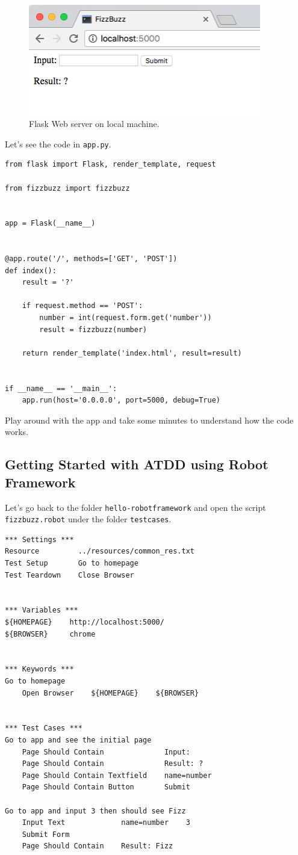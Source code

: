 \documentclass{article}
\begin{document}
\begin{figure}[t]
  \centering
  \includegraphics[width=4in]{figures/flask-web-server-local}
  \caption{Flask Web server on local machine.}
  \label{fig:flask-web-server-local}
\end{figure}

\noindent Let's see the code in {\tt app.py}.

\begin{verbatim}
from flask import Flask, render_template, request

from fizzbuzz import fizzbuzz


app = Flask(__name__)


@app.route('/', methods=['GET', 'POST'])
def index():
    result = '?'

    if request.method == 'POST':
        number = int(request.form.get('number'))
        result = fizzbuzz(number)

    return render_template('index.html', result=result)


if __name__ == '__main__':
    app.run(host='0.0.0.0', port=5000, debug=True)
\end{verbatim}

\noindent Play around with the app and take some minutes to understand how the
code works.

\subsection*{Getting Started with ATDD using Robot Framework}

\noindent Let's go back to the folder {\tt hello-robotframework} and open the
script {\tt fizzbuzz.robot} under the folder {\tt testcases}.

\begin{verbatim}
*** Settings ***
Resource         ../resources/common_res.txt
Test Setup       Go to homepage
Test Teardown    Close Browser


*** Variables ***
${HOMEPAGE}    http://localhost:5000/
${BROWSER}     chrome


*** Keywords ***
Go to homepage
    Open Browser    ${HOMEPAGE}    ${BROWSER}


*** Test Cases ***
Go to app and see the initial page
    Page Should Contain              Input:
    Page Should Contain              Result: ?
    Page Should Contain Textfield    name=number
    Page Should Contain Button       Submit

Go to app and input 3 then should see Fizz
    Input Text             name=number    3
    Submit Form
    Page Should Contain    Result: Fizz
\end{verbatim}
\end{document}
